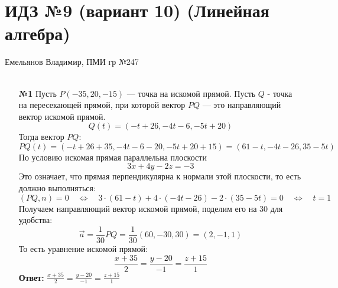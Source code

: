 \documentclass[a4paper]{article}
\renewcommand{\f}[2]{\frac{#1}{#2}}
\newcommand{\lr}{\Leftrightarrow}
\begin{document}
\section*{ИДЗ №9 (вариант 10) (Линейная алгебра)}
 {\large Емельянов Владимир, ПМИ гр №247}\\\\
\begin{enumerate}
    \item[\textbf{№1}]Пусть $P(-35,20,-15)$ --- точка на искомой прямой. Пусть $Q$ - точка на пересекающей прямой, при которой вектор $PQ$ --- это направляющий вектор искомой прямой.
    $$Q(t) = (-t+26, -4t-6, -5t+20)$$
    Тогда вектор $PQ$:
    $$PQ(t) = (-t+26+35, -4t-6-20, -5t+20+15) = (61-t, -4t-26, 35-5t)$$
    По условию искомая прямая параллельна плоскости 
    $$3x+4y-2z=-3$$ 
    Это означает, что прямая перпендикулярна к нормали этой плоскости, то есть должно выполняться:
    $$(PQ, n) = 0 \quad \lr \quad  3\cdot(61-t) + 4\cdot(-4t-26) -2\cdot(35-5t) = 0 \quad \lr \quad t = 1$$
    Получаем направляющий вектор искомой прямой, поделим его на $30$ для удобства:
    $$\vec{a} = \f{1}{30}PQ= \f{1}{30}(60, -30, 30) = (2, -1, 1)$$
    То есть уравнение искомой прямой:
    $$\f{x+35}{2} = \f{y-20}{-1} = \f{z+15}{1}$$
    \textbf{Ответ: }$\f{x+35}{2} = \f{y-20}{-1} = \f{z+15}{1}$

\end{enumerate}
\end{document}
